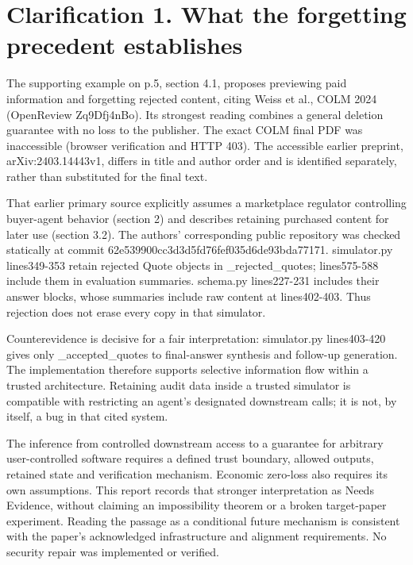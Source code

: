 \documentclass[10pt]{article}
\begin{document}
\section*{Clarification 1. What the forgetting precedent establishes}
The supporting example on p.5, section 4.1, proposes previewing paid information and forgetting rejected content, citing Weiss et al., COLM 2024 (OpenReview Zq9Dfj4nBo). Its strongest reading combines a general deletion guarantee with no loss to the publisher. The exact COLM final PDF was inaccessible (browser verification and HTTP 403). The accessible earlier preprint, arXiv:2403.14443v1, differs in title and author order and is identified separately, rather than substituted for the final text.\par
That earlier primary source explicitly assumes a marketplace regulator controlling buyer-agent behavior (section 2) and describes retaining purchased content for later use (section 3.2). The authors’ corresponding public repository was checked statically at commit 62e539900cc3d3d5fd76fef035d6de93bda77171. simulator.py lines349-353 retain rejected Quote objects in \_rejected\_quotes; lines575-588 include them in evaluation summaries. schema.py lines227-231 includes their answer blocks, whose summaries include raw content at lines402-403. Thus rejection does not erase every copy in that simulator.\par
Counterevidence is decisive for a fair interpretation: simulator.py lines403-420 gives only \_accepted\_quotes to final-answer synthesis and follow-up generation. The implementation therefore supports selective information flow within a trusted architecture. Retaining audit data inside a trusted simulator is compatible with restricting an agent’s designated downstream calls; it is not, by itself, a bug in that cited system.\par
The inference from controlled downstream access to a guarantee for arbitrary user-controlled software requires a defined trust boundary, allowed outputs, retained state and verification mechanism. Economic zero-loss also requires its own assumptions. This report records that stronger interpretation as Needs Evidence, without claiming an impossibility theorem or a broken target-paper experiment. Reading the passage as a conditional future mechanism is consistent with the paper’s acknowledged infrastructure and alignment requirements. No security repair was implemented or verified.\par
\end{document}
